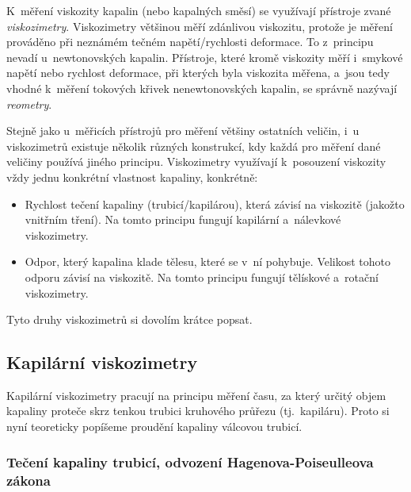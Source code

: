 \documentclass[12pt]{article}
\begin{document}
K~měření viskozity kapalin (nebo kapalných směsí) se využívají přístroje zvané \emph{viskozimetry}. Viskozimetry většinou měří zdánlivou viskozitu, protože je měření prováděno při neznámém tečném napětí/rychlosti deformace. To z~principu nevadí u~newtonovských kapalin. Přístroje, které kromě viskozity měří i~smykové napětí nebo rychlost deformace, při kterých byla viskozita měřena, a~jsou tedy vhodné k~měření tokových křivek nenewtonovských kapalin, se správně nazývají \emph{reometry}.~\cite{wiki:Viscometer}
\par
Stejně jako u~měřicích přístrojů pro měření většiny ostatních veličin, i~u viskozimetrů existuje několik různých konstrukcí, kdy každá pro měření dané veličiny používá jiného principu. Viskozimetry využívají k~posouzení viskozity vždy jednu konkrétní vlastnost kapaliny, konkrétně:
\begin{itemize}[noitemsep, topsep = 0pt]
    \item Rychlost tečení kapaliny (trubicí/kapilárou), která závisí na viskozitě (jakožto vnitřním tření). Na tomto principu fungují kapilární a~nálevkové viskozimetry.
    \item Odpor, který kapalina klade tělesu, které se v~ní pohybuje. Velikost tohoto odporu závisí na viskozitě. Na tomto principu fungují tělískové a~rotační viskozimetry.
\end{itemize}
Tyto druhy viskozimetrů si dovolím krátce popsat.

\subsection{Kapilární viskozimetry}%

Kapilární viskozimetry pracují na principu měření času, za který určitý objem kapaliny proteče skrz tenkou trubici kruhového průřezu (tj.~kapiláru). Proto si nyní teoreticky popíšeme proudění kapaliny válcovou trubicí.

\subsubsection{Tečení kapaliny trubicí, odvození Hagenova-Poiseulleova zákona}
\label{sec:tečení_trubicí}%
\end{document}
